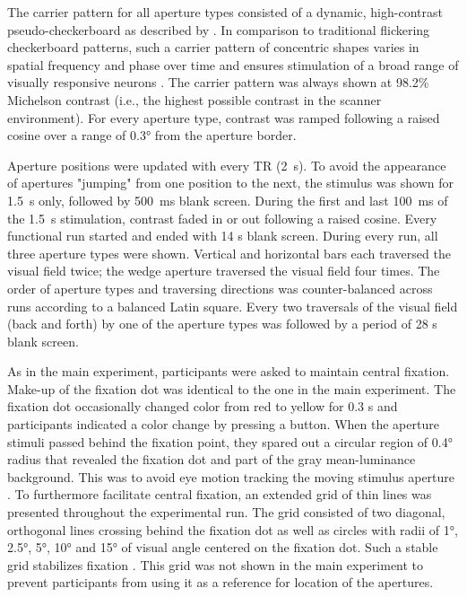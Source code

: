 The carrier pattern for all aperture types consisted of a dynamic, high-contrast pseudo-checkerboard as described by \cite{Schwarzkopf2014}. In comparison to traditional flickering checkerboard patterns, such a carrier pattern of concentric shapes varies in spatial frequency and phase over time and ensures stimulation of a broad range of visually responsive neurons \parencite{Alvarez2015}. The carrier pattern was always shown at 98.2\% Michelson contrast (i.e., the highest possible contrast in the scanner environment). For every aperture type, contrast was ramped following a raised cosine over a range of 0.3° from the aperture border.

Aperture positions were updated with every TR (2~s). To avoid the appearance of apertures "jumping" from one position to the next, the stimulus was shown for 1.5~s only, followed by 500~ms blank screen. During the first and last 100~ms of the 1.5~s stimulation, contrast faded in or out following a raised cosine. Every functional run started and ended with 14 s blank screen. During every run, all three aperture types were shown. Vertical and horizontal bars each traversed the visual field twice; the wedge aperture traversed the visual field four times. The order of aperture types and traversing directions was counter-balanced across runs according to a balanced Latin square. Every two traversals of the visual field (back and forth) by one of the aperture types was followed by a period of 28 s blank screen.

As in the main experiment, participants were asked to maintain central fixation. Make-up of the fixation dot was identical to the one in the main experiment. The fixation dot occasionally changed color from red to yellow for 0.3 s and participants indicated a color change by pressing a button. When the aperture stimuli passed behind the fixation point, they spared out a circular region of 0.4° radius that revealed the fixation dot and part of the gray mean-luminance background. This was to avoid eye motion tracking the moving stimulus aperture \parencite{Harvey2016}. To furthermore facilitate central fixation, an extended grid of thin lines was presented throughout the experimental run. The grid consisted of two diagonal, orthogonal lines crossing behind the fixation dot as well as circles with radii of 1°, 2.5°, 5°, 10° and 15° of visual angle centered on the fixation dot. Such a stable grid stabilizes fixation \parencite{Tyler2005}. This grid was not shown in the main experiment to prevent participants from using it as a reference for location of the apertures.

